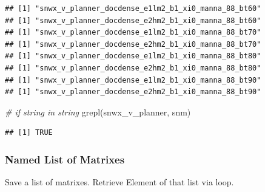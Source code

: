 \documentclass[
]{book}
\newenvironment{Shaded}{\begin{snugshade}}{\end{snugshade}}
\newcommand{\CommentTok}[1]{\textcolor[rgb]{0.56,0.35,0.01}{\textit{#1}}}
\newcommand{\FunctionTok}[1]{\textcolor[rgb]{0.00,0.00,0.00}{#1}}
\newcommand{\NormalTok}[1]{#1}
\newcommand{\StringTok}[1]{\textcolor[rgb]{0.31,0.60,0.02}{#1}}
\begin{document}
\begin{verbatim}
## [1] "snwx_v_planner_docdense_e1lm2_b1_xi0_manna_88_bt60"
## [1] "snwx_v_planner_docdense_e2hm2_b1_xi0_manna_88_bt60"
## [1] "snwx_v_planner_docdense_e1lm2_b1_xi0_manna_88_bt70"
## [1] "snwx_v_planner_docdense_e2hm2_b1_xi0_manna_88_bt70"
## [1] "snwx_v_planner_docdense_e1lm2_b1_xi0_manna_88_bt80"
## [1] "snwx_v_planner_docdense_e2hm2_b1_xi0_manna_88_bt80"
## [1] "snwx_v_planner_docdense_e1lm2_b1_xi0_manna_88_bt90"
## [1] "snwx_v_planner_docdense_e2hm2_b1_xi0_manna_88_bt90"
\end{verbatim}

\begin{Shaded}
\begin{Highlighting}[]
\CommentTok{\# if string in string}
\FunctionTok{grepl}\NormalTok{(}\StringTok{\textquotesingle{}snwx\_v\_planner\textquotesingle{}}\NormalTok{, snm)}
\end{Highlighting}
\end{Shaded}

\begin{verbatim}
## [1] TRUE
\end{verbatim}

\hypertarget{named-list-of-matrixes}{%
\subsubsection{Named List of Matrixes}\label{named-list-of-matrixes}}

Save a list of matrixes. Retrieve Element of that list via loop.
\end{document}
